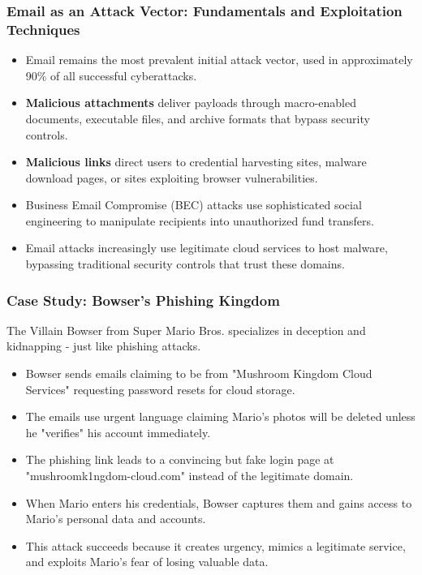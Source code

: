 \documentclass{beamer}
\begin{document}
\begin{frame}
    \frametitle{Email as an Attack Vector: Fundamentals and Exploitation Techniques}
    
    \begin{itemize}
        \item Email remains the most prevalent initial attack vector, used in approximately 90\% of all successful cyberattacks.
        \item \textbf{Malicious attachments} deliver payloads through macro-enabled documents, executable files, and archive formats that bypass security controls.
        \item \textbf{Malicious links} direct users to credential harvesting sites, malware download pages, or sites exploiting browser vulnerabilities.
        \item Business Email Compromise (BEC) attacks use sophisticated social engineering to manipulate recipients into unauthorized fund transfers.
        \item Email attacks increasingly use legitimate cloud services to host malware, bypassing traditional security controls that trust these domains.
    \end{itemize}
\end{frame}

\begin{frame}
    \frametitle{Case Study: Bowser's Phishing Kingdom}
    
    \begin{block}{The Villain}
        Bowser from Super Mario Bros. specializes in deception and kidnapping - just like phishing attacks.
    \end{block}
    
    \begin{itemize}
        \item Bowser sends emails claiming to be from "Mushroom Kingdom Cloud Services" requesting password resets for cloud storage.
        \item The emails use urgent language claiming Mario's photos will be deleted unless he "verifies" his account immediately.
        \item The phishing link leads to a convincing but fake login page at "mushroomk1ngdom-cloud.com" instead of the legitimate domain.
        \item When Mario enters his credentials, Bowser captures them and gains access to Mario's personal data and accounts.
        \item This attack succeeds because it creates urgency, mimics a legitimate service, and exploits Mario's fear of losing valuable data.
    \end{itemize}
\end{frame}
\end{document}

